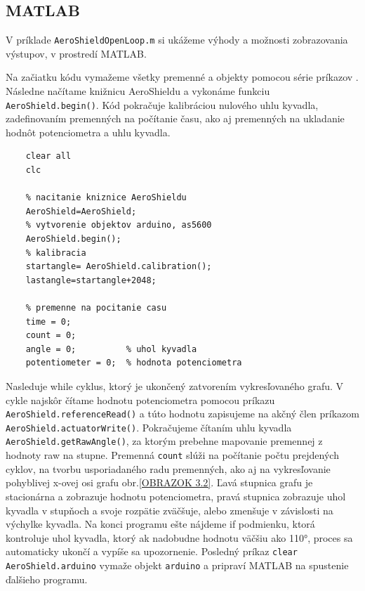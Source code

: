 \newpage
\subsection{MATLAB}
\label{MatlabPID}

V príklade \verb|AeroShieldOpenLoop.m| si ukážeme výhody a možnosti zobrazovania výstupov, v prostredí MATLAB. 

Na začiatku kódu vymažeme všetky premenné a objekty pomocou série príkazov . Následne načítame knižnicu AeroShieldu a vykonáme funkciu \verb|AeroShield.begin()|. Kód pokračuje kalibráciou nulového uhlu kyvadla, zadefinovaním premenných na počítanie času, ako aj premenných na ukladanie hodnôt potenciometra a uhlu kyvadla. 

\begin{lstlisting}[caption={AeroShield open loop inicializacia.},captionpos=b]
	% vymazanie premennych a objektov 
	clear all
	clc 
	
	% nacitanie kniznice AeroShieldu  
	AeroShield=AeroShield;
	% vytvorenie objektov arduino, as5600
	AeroShield.begin();
	% kalibracia
	startangle= AeroShield.calibration(); 
	lastangle=startangle+2048; 
	
	% premenne na pocitanie casu
	time = 0;
	count = 0;
	angle = 0;          % uhol kyvadla
	potentiometer = 0;  % hodnota potenciometra
\end{lstlisting}

Nasleduje while cyklus, ktorý je ukončený zatvorením vykresľovaného grafu. V cykle najskôr čítame hodnotu potenciometra pomocou príkazu \verb|AeroShield.referenceRead()| a túto hodnotu zapisujeme na akčný člen príkazom \verb| AeroShield.actuatorWrite()|. Pokračujeme čítaním uhlu kyvadla \verb|AeroShield.getRawAngle()|, za ktorým prebehne mapovanie premennej z hodnoty raw na stupne. Premenná \verb|count| slúži na počítanie počtu prejdených cyklov, na tvorbu usporiadaného radu premenných, ako aj na vykresľovanie pohyblivej x-ovej osi grafu obr.\ref{OBRAZOK 3.2}. Ľavá stupnica grafu je stacionárna a zobrazuje hodnotu potenciometra, pravá stupnica zobrazuje uhol kyvadla v stupňoch a svoje rozpätie zväčšuje, alebo zmenšuje v závislosti na výchylke kyvadla. Na konci programu ešte nájdeme if podmienku, ktorá kontroluje uhol kyvadla, ktorý ak nadobudne hodnotu väčšiu ako 110°, proces sa automaticky ukončí a vypíše sa upozornenie. Posledný príkaz \verb|clear AeroShield.arduino| vymaže objekt \verb|arduino| a pripraví MATLAB na spustenie ďalšieho programu. 

